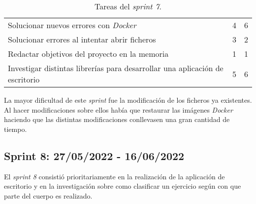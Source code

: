 \begin{table}[H]
{\begin{tabular}{p{10cm}cc}
\rowcolor[HTML]{EFEFEF} 
Solucionar nuevos errores con \textit{Docker}                                         & 4                                                         & 6                                                          \\
\rowcolor[HTML]{ECF4FF} 
Solucionar errores al intentar abrir ficheros                                & 3                                                         & 2                                                          \\
\rowcolor[HTML]{EFEFEF} 
Redactar objetivos del proyecto en la memoria                                & 1                                                         & 1                                                          \\
\rowcolor[HTML]{ECF4FF} 
Investigar distintas librerías para desarrollar una aplicación de escritorio & 5                                                         & 6                                                          \\ \hline
\end{tabular}
}
\caption{Tareas del \textit{sprint 7}.}
\label{sprint7}
\end{table}

La mayor dificultad de este \textit{sprint} fue la modificación de los ficheros ya existentes. Al hacer modificaciones sobre ellos había que restaurar las imágenes \textit{Docker} haciendo que las distintas modificaciones conllevasen una gran cantidad de tiempo. 

\subsection{Sprint 8: 27/05/2022 - 16/06/2022}

El \textit{sprint 8} consistió prioritariamente en la realización de la aplicación de escritorio y en la investigación sobre como clasificar un ejercicio según con que parte del cuerpo es realizado. 

